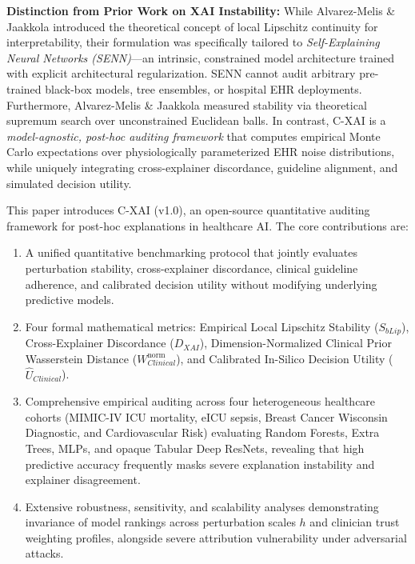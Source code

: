 \documentclass[3p,times,procedia]{elsarticle}
\theoremstyle{definition}
\begin{document}
\textbf{Distinction from Prior Work on XAI Instability:}  
While Alvarez-Melis \& Jaakkola \cite{alvarezmelis2018towards} introduced the theoretical concept of local Lipschitz continuity for interpretability, their formulation was specifically tailored to \textit{Self-Explaining Neural Networks (SENN)}—an intrinsic, constrained model architecture trained with explicit architectural regularization. SENN cannot audit arbitrary pre-trained black-box models, tree ensembles, or hospital EHR deployments. Furthermore, Alvarez-Melis \& Jaakkola measured stability via theoretical supremum search over unconstrained Euclidean balls. In contrast, C-XAI is a \textit{model-agnostic, post-hoc auditing framework} that computes empirical Monte Carlo expectations over physiologically parameterized EHR noise distributions, while uniquely integrating cross-explainer discordance, guideline alignment, and simulated decision utility.

This paper introduces C-XAI (v1.0), an open-source quantitative auditing framework for post-hoc explanations in healthcare AI. The core contributions are:
\begin{enumerate}
    \item A unified quantitative benchmarking protocol that jointly evaluates perturbation stability, cross-explainer discordance, clinical guideline adherence, and calibrated decision utility without modifying underlying predictive models.
    \item Four formal mathematical metrics: Empirical Local Lipschitz Stability ($S_{bLip}$), Cross-Explainer Discordance ($D_{XAI}$), Dimension-Normalized Clinical Prior Wasserstein Distance ($W_{Clinical}^{\mathrm{norm}}$), and Calibrated In-Silico Decision Utility ($\widehat{U}_{Clinical}$).
    \item Comprehensive empirical auditing across four heterogeneous healthcare cohorts (MIMIC-IV ICU mortality, eICU sepsis, Breast Cancer Wisconsin Diagnostic, and Cardiovascular Risk) evaluating Random Forests, Extra Trees, MLPs, and opaque Tabular Deep ResNets, revealing that high predictive accuracy frequently masks severe explanation instability and explainer disagreement.
    \item Extensive robustness, sensitivity, and scalability analyses demonstrating invariance of model rankings across perturbation scales $h$ and clinician trust weighting profiles, alongside severe attribution vulnerability under adversarial attacks.
\end{enumerate}
\end{document}
